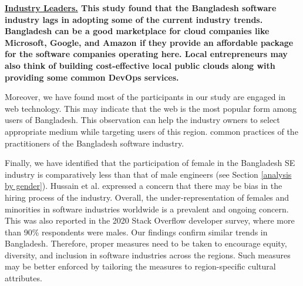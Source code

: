 \bf{\ul{Industry Leaders.}} This study found that the Bangladesh software
industry lags in adopting some of the current industry trends. Bangladesh can be
a good marketplace for cloud companies like Microsoft, Google, and Amazon if
they provide an affordable package for the software companies operating here.
Local entrepreneurs may also think of building cost-effective local public
clouds along with providing some common DevOps services.

Moreover, we have found most of the participants in our study are engaged in web
technology. This may indicate that the web is the most popular form among users
of Bangladesh. This observation can help the industry owners to select
appropriate medium while targeting users of this region. %
common practices of the practitioners of the Bangladesh software industry.

Finally, we have identified that the
participation of female in the Bangladesh SE industry is comparatively less than
that of male engineers (see Section \ref{analysis by gender}). Hussain et al.\citep{Hussain2020} expressed a
concern that there may be bias in the hiring process of the industry. Overall, the under-representation of 
females and minorities in software industries worldwide is a prevalent and ongoing concern. 
This was also reported in the 2020 Stack Overflow developer survey, where more than 90\% respondents 
were males. Our findings confirm similar trends in Bangladesh. Therefore, proper measures 
need to be taken to encourage equity, diversity, and inclusion in software industries across the regions.  
Such measures may be better enforced by tailoring the measures to region-specific cultural attributes.


